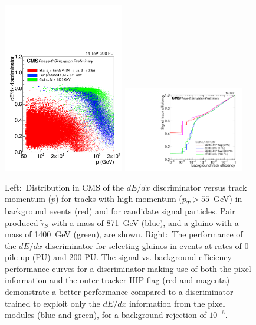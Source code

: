 \begin{figure}[t]
\begin{center}
  \includegraphics[width=0.47\textwidth]{figures/HSCP/TDR-17-001_fig6_26_a_HSCP_SpecialPlot_v2.pdf} \hfill
  \includegraphics[width=0.47\textwidth]{figures/HSCP/TDR-17-001_fig6_27_a_HSCP_Comparison_ROC_Gluino_M1400_NoPU_Super_v2.pdf}
  \caption{Left:~Distribution in CMS of the $dE/dx$ discriminator versus track momentum ($p$) for tracks with high momentum ($p_T > 55$~GeV) in background events (red) and for candidate signal particles. Pair produced $\tilde{\tau}_S$ with a mass of 871~GeV (blue), and a gluino with a mass of 1400~GeV (green), are shown. Right:~The performance of the $dE/dx$ discriminator for selecting gluinos in events at rates of 0 pile-up (PU) and 200 PU. The signal vs. background efficiency performance curves for a discriminator making use of both the pixel information and the outer tracker HIP flag (red and magenta) demonstrate a better performance compared to a discriminator trained to exploit only the $dE/dx$ information from the pixel modules (blue and green), for a background rejection of $10^{-6}$.}
  \label{fig:cmsupgrade_hscp}
\end{center}
\end{figure}

